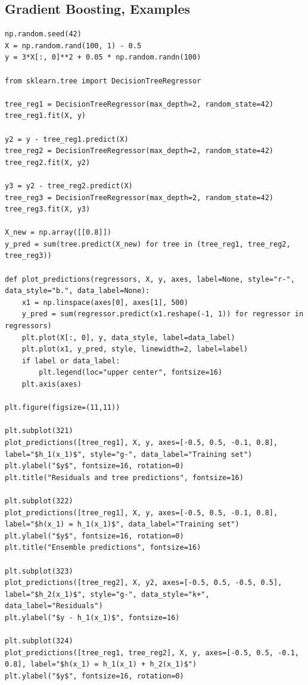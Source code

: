 \documentclass[%
oneside,                 %
final,                   %
10pt]{article}
\begin{document}
\subsection*{Gradient Boosting, Examples}
\begin{verbatim}
np.random.seed(42)
X = np.random.rand(100, 1) - 0.5
y = 3*X[:, 0]**2 + 0.05 * np.random.randn(100)

from sklearn.tree import DecisionTreeRegressor

tree_reg1 = DecisionTreeRegressor(max_depth=2, random_state=42)
tree_reg1.fit(X, y)

y2 = y - tree_reg1.predict(X)
tree_reg2 = DecisionTreeRegressor(max_depth=2, random_state=42)
tree_reg2.fit(X, y2)

y3 = y2 - tree_reg2.predict(X)
tree_reg3 = DecisionTreeRegressor(max_depth=2, random_state=42)
tree_reg3.fit(X, y3)

X_new = np.array([[0.8]])
y_pred = sum(tree.predict(X_new) for tree in (tree_reg1, tree_reg2, tree_reg3))

def plot_predictions(regressors, X, y, axes, label=None, style="r-", data_style="b.", data_label=None):
    x1 = np.linspace(axes[0], axes[1], 500)
    y_pred = sum(regressor.predict(x1.reshape(-1, 1)) for regressor in regressors)
    plt.plot(X[:, 0], y, data_style, label=data_label)
    plt.plot(x1, y_pred, style, linewidth=2, label=label)
    if label or data_label:
        plt.legend(loc="upper center", fontsize=16)
    plt.axis(axes)

plt.figure(figsize=(11,11))

plt.subplot(321)
plot_predictions([tree_reg1], X, y, axes=[-0.5, 0.5, -0.1, 0.8], label="$h_1(x_1)$", style="g-", data_label="Training set")
plt.ylabel("$y$", fontsize=16, rotation=0)
plt.title("Residuals and tree predictions", fontsize=16)

plt.subplot(322)
plot_predictions([tree_reg1], X, y, axes=[-0.5, 0.5, -0.1, 0.8], label="$h(x_1) = h_1(x_1)$", data_label="Training set")
plt.ylabel("$y$", fontsize=16, rotation=0)
plt.title("Ensemble predictions", fontsize=16)

plt.subplot(323)
plot_predictions([tree_reg2], X, y2, axes=[-0.5, 0.5, -0.5, 0.5], label="$h_2(x_1)$", style="g-", data_style="k+", data_label="Residuals")
plt.ylabel("$y - h_1(x_1)$", fontsize=16)

plt.subplot(324)
plot_predictions([tree_reg1, tree_reg2], X, y, axes=[-0.5, 0.5, -0.1, 0.8], label="$h(x_1) = h_1(x_1) + h_2(x_1)$")
plt.ylabel("$y$", fontsize=16, rotation=0)


\end{verbatim}
\end{document}
